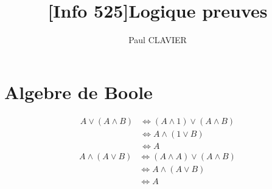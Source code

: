 \documentclass[10pt,a4paper]{article}
\author{Paul CLAVIER}
\title{[Info 525]Logique preuves}
\begin{document}
\section{Algebre de Boole}
	\begin{align*}
		A\vee (A\wedge B) &\Leftrightarrow (A\wedge 1) \vee (A\wedge B) \\&\Leftrightarrow A\wedge(1\vee B) \\&\Leftrightarrow A
	\end{align*}
	\begin{align*}
		A\wedge (A\vee B)&\Leftrightarrow (A\wedge A) \vee (A\wedge B) \\&\Leftrightarrow A\wedge (A\vee B) \\&\Leftrightarrow A
	\end{align*}
\end{document}
